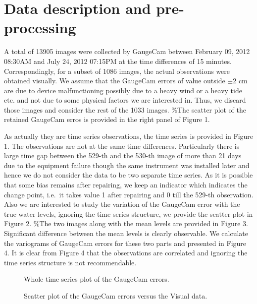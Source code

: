 \documentclass[]{article}
\begin{document}
\section{Data description and pre-processing}\label{s:data}

A total of 13905 images were collected by GaugeCam between February 09, 2012 08:30AM and July 24, 2012 07:15PM at the time differences of 15 minutes. Correspondingly, for a subset of 1086 images, the actual observations were obtained visually. We assume that the GaugeCam errors of value outside \(\pm 2\) cm are due to device malfunctioning possibly due to a heavy wind or a heavy tide etc. and not due to some physical factors we are interested in. Thus, we discard those images and consider the rest of the 1033 images. \%The scatter plot of the retained GaugeCam erros is provided in the right panel of Figure 1.

As actually they are time series observations, the time series is provided in Figure 1. The observations are not at the same time differences. Particularly there is large time gap between the 529-th and the 530-th image of more than 21 days due to the equipment failure though the same instrument was installed later and hence we do not consider the data to be two separate time series. As it is possible that some bias remains after repairing, we keep an indicator which indicates the change point, i.e.~it takes value 1 after repairing and 0 till the 529-th observation. Also we are interested to study the variation of the GaugeCam error with the true water levels, ignoring the time series structure, we provide the scatter plot in Figure 2. \%The two images along with the mean levels are provided in Figure 3. Significant difference between the mean levels is clearly observable. We calculate the variograms of GaugeCam errors for these two parts and presented in Figure 4. It is clear from Figure 4 that the observations are correlated and ignoring the time series structure is not recommendable.

\begin{figure} 
\centering
{} \label{gaugecamts}
\caption{Whole time series plot of the GaugeCam errors.}
\end{figure}

\begin{figure}
\centering
{}
\caption{Scatter plot of the GaugeCam errors versus the Visual data.}
\end{figure}
\end{document}
